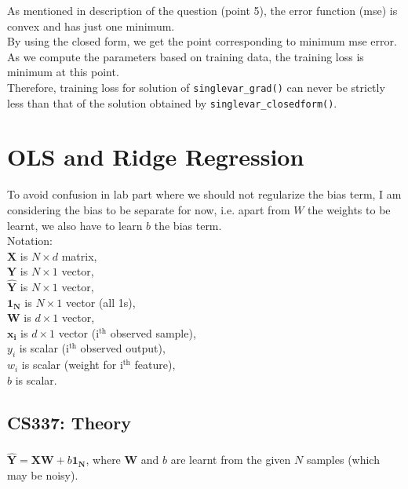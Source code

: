 \documentclass[12pt, fleqn]{article}
\begin{document}
\subsubsection{}
As mentioned in description of the question (point 5), the error function (mse) is convex and has just one minimum. \\
By using the closed form, we get the point corresponding to minimum mse error. As we compute the parameters based on training data, the training loss is minimum at this point. \\
Therefore, training loss for solution of \verb!singlevar_grad()! can never be strictly less than that of the solution obtained by \verb!singlevar_closedform()!.


\newpage
\section{OLS and Ridge Regression}
To avoid confusion in lab part where we should not regularize the bias term, I am considering the bias to be separate for now, i.e. apart from $W$ the weights to be learnt, we also have to learn $b$ the bias term. \\

Notation: \\
$\mathbf{X}$ is $N \times d$ matrix, \\
$\mathbf{Y}$ is $N \times 1$ vector, \\
$\hat{\mathbf{Y}}$ is $N \times 1$ vector, \\
$\mathbf{1_N}$ is $N \times 1$ vector (all 1s), \\
$\mathbf{W}$ is $d \times 1$ vector, \\
$\mathbf{x_i}$ is $d \times 1$ vector (i$^\text{th}$ observed sample), \\
$y_i$ is scalar (i$^\text{th}$ observed output), \\
$w_i$ is scalar (weight for i$^\text{th}$ feature), \\
$b$ is scalar.

\subsection{CS337: Theory}
\subsubsection{}
$\hat{\mathbf{Y}} = \mathbf{X} \mathbf{W} + b \mathbf{1_N}$, where $\mathbf{W}$ and $b$ are learnt from the given $N$ samples (which may be noisy).
\end{document}
